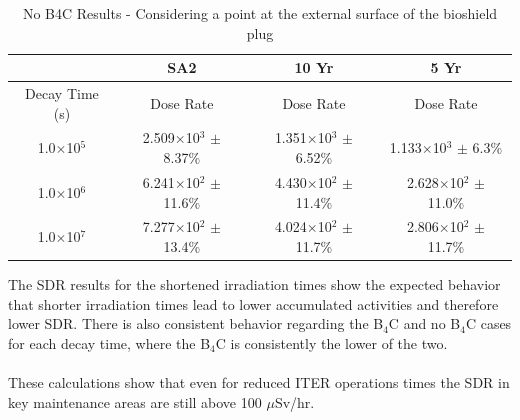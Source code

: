 \documentclass[12pt]{article}
\begin{document}
\begin{table}[ht!]
   \centering      
   \begin{tabular}{| c | c | c | c |}
      \hline
      & SA2 & 10 Yr & 5 Yr \\
      \hline
      Decay Time (s) & Dose Rate & Dose Rate & Dose Rate \\
      \hline
      1.0$\times$10$^{5}$ & 2.509$\times$10$^{3}$ $\pm$ 8.37\% & 1.351$\times$10$^{3}$ $\pm$ 6.52\% & 1.133$\times$10$^{3}$ $\pm$ 6.3\%\\
      1.0$\times$10$^{6}$ & 6.241$\times$10$^{2}$ $\pm$ 11.6\% & 4.430$\times$10$^{2}$ $\pm$ 11.4\% & 2.628$\times$10$^{2}$ $\pm$ 11.0\%\\
      1.0$\times$10$^{7}$ & 7.277$\times$10$^{2}$ $\pm$ 13.4\% & 4.024$\times$10$^{2}$ $\pm$ 11.7\% & 2.806$\times$10$^{2}$ $\pm$ 11.7\%\\
      \hline
\end{tabular}
\caption{No B4C Results - Considering a point at the external surface of the bioshield plug}
\label{tab:nob4c_summary_scenario}
\end{table}

The SDR results for the shortened irradiation times show the expected behavior 
that shorter irradiation times lead to lower accumulated activities and therefore
lower SDR.  There is also consistent behavior regarding the B$_4$C and no B$_4$C
cases for each decay time, where the B$_4$C is consistently the lower of the two.
\\
\\
These calculations show that even for reduced ITER operations times the SDR
in key maintenance areas are still above 100 $\mu$Sv/hr. 
\newpage


\newpage
\clearpage
\end{document}
